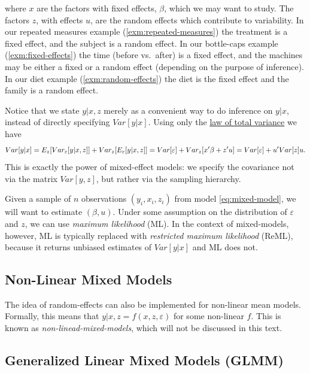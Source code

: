 \documentclass[]{book}
\theoremstyle{definition}
\theoremstyle{definition}
\theoremstyle{definition}
\theoremstyle{remark}
\begin{document}
where \(x\) are the factors with fixed effects, \(\beta\), which we may
want to study. The factors \(z\), with effects \(u\), are the random
effects which contribute to variability. In our repeated measures
example (\ref{exm:repeated-measures}) the treatment is a fixed effect,
and the subject is a random effect. In our bottle-caps example
(\ref{exm:fixed-effects}) the time (before vs.~after) is a fixed effect,
and the machines may be either a fixed or a random effect (depending on
the purpose of inference). In our diet example
(\ref{exm:random-effects}) the diet is the fixed effect and the family
is a random effect.

Notice that we state \(y|x,z\) merely as a convenient way to do
inference on \(y|x\), instead of directly specifying \(Var[y|x]\). Using
only the \href{https://en.wikipedia.org/wiki/Law_of_total_variance}{law
of total variance} we have
\[Var[y|x]=E_z[Var_\varepsilon[y|x,z]]+Var_z[E_\varepsilon[y|x,z]]=\\
Var[\varepsilon]+Var_z[x'\beta+z'u]=\\
Var[\varepsilon]+u'Var[z]u.\] This is exactly the power of mixed-effect
models: we specify the covariance not via the matrix \(Var[y,z]\), but
rather via the sampling hierarchy.

Given a sample of \(n\) observations \((y_i,x_i,z_i)\) from model
\eqref{eq:mixed-model}, we will want to estimate \((\beta,u)\). Under some
assumption on the distribution of \(\varepsilon\) and \(z\), we can use
\emph{maximum likelihood} (ML). In the context of mixed-models, however,
ML is typically replaced with \emph{restricted maximum likelihood}
(ReML), because it returns unbiased estimates of \(Var[y|x]\) and ML
does not.

\subsection{Non-Linear Mixed Models}\label{non-linear-mixed-models}

The idea of random-effects can also be implemented for non-linear mean
models. Formally, this means that \(y|x,z=f(x,z,\varepsilon)\) for some
non-linear \(f\). This is known as \emph{non-linead-mixed-models}, which
will not be discussed in this text.

\subsection{Generalized Linear Mixed Models
(GLMM)}\label{generalized-linear-mixed-models-glmm}
\end{document}
